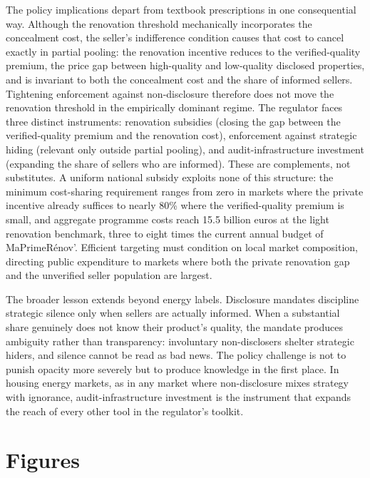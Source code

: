 \documentclass[10pt,letterpaper]{bp-template-concise}
\begin{document}
The policy implications depart from textbook prescriptions in one consequential way. Although the renovation threshold mechanically incorporates the concealment cost, the seller's indifference condition causes that cost to cancel exactly in partial pooling: the renovation incentive reduces to the verified-quality premium, the price gap between high-quality and low-quality disclosed properties, and is invariant to both the concealment cost and the share of informed sellers. Tightening enforcement against non-disclosure therefore does not move the renovation threshold in the empirically dominant regime. The regulator faces three distinct instruments: renovation subsidies (closing the gap between the verified-quality premium and the renovation cost), enforcement against strategic hiding (relevant only outside partial pooling), and audit-infrastructure investment (expanding the share of sellers who are informed). These are complements, not substitutes. A uniform national subsidy exploits none of this structure: the minimum cost-sharing requirement ranges from zero in markets where the private incentive already suffices to nearly 80\% where the verified-quality premium is small, and aggregate programme costs reach 15.5 billion euros at the light renovation benchmark, three to eight times the current annual budget of MaPrimeR\'enov'. Efficient targeting must condition on local market composition, directing public expenditure to markets where both the private renovation gap and the unverified seller population are largest.

The broader lesson extends beyond energy labels. Disclosure mandates discipline strategic silence only when sellers are actually informed. When a substantial share genuinely does not know their product's quality, the mandate produces ambiguity rather than transparency: involuntary non-disclosers shelter strategic hiders, and silence cannot be read as bad news. The policy challenge is not to punish opacity more severely but to produce knowledge in the first place. In housing energy markets, as in any market where non-disclosure mixes strategy with ignorance, audit-infrastructure investment is the instrument that expands the reach of every other tool in the regulator's toolkit.

\clearpage
\appendix

\section{Figures}\label{sec:appendix_figures}
\end{document}
